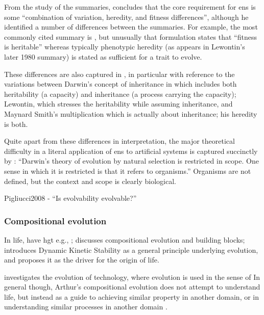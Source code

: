From the study of the summaries, \cite{Godfrey-Smith2007} concludes that the core requirement for \gls{ens} is some ``combination of variation, heredity, and fitness differences'', although he identified a number of differences between the summaries. For example, the most commonly cited summary is \cite{Lewontin:1970mc}, but unusually that formulation states that ``fitness is heritable'' whereas typically phenotypic heredity (as appears in Lewontin's later 1980 summary) is stated as sufficient for a trait to evolve. 

These differences are also captured in \autocite{Griesemer2001}, in particular with reference to the variations between Darwin's concept of inheritance in \cite{Darwin1859} which includes both heritability (a capacity) and inheritance (a process carrying the capacity); Lewontin, which stresses the heritability while assuming inheritance, and Maynard Smith's multiplication which is actually about inheritance; his heredity is both. \autocite{Griesemer2001}

Quite apart from these differences in interpretation, the major theoretical difficulty in a literal application of \gls{ens} to artificial systems is captured succinctly by \autocite{Griesemer2005}: ``Darwin's theory of evolution by natural selection is restricted in scope. One sense in which it is restricted is that it refers to organisms.'' Organisms are not defined, but the context and scope is clearly biological.

Pigliucci2008 - ``Is evolvability evolvable?''

\subsubsection{Compositional evolution}

In life, have \gls{hgt} e.g., \autocite{Ochman2000}; \autocite{Watson2002} discusses compositional evolution and building blocks; \autocite{Pross2011} introduces Dynamic Kinetic Stability as a general principle underlying evolution, and proposes it as the driver for the origin of life.

\autocite{Arthur2009} investigates the evolution of technology, where evolution is used in the sense of  In general though, Arthur's compositional evolution does not attempt to understand life, but instead as a guide to achieving similar property in another domain, or in understanding similar processes in another domain \autocite{Arthur2009}.

